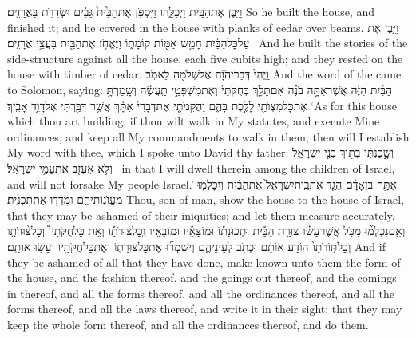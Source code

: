 {וַיִּ֥בֶן אֶת\maqqaf הַבַּ֖יִת וַיְכַלֵּ֑הוּ וַיִּסְפֹּ֤ן אֶת\maqqaf הַבַּ֙יִת֙ גֵּבִ֔ים וּשְׂדֵרֹ֖ת בָּאֲרָזִֽים׃}
{So he built the house, and finished it; and he covered in the house with planks of cedar over beams.}
{וַיִּ֤בֶן אֶת\maqqaf {} עַל\maqqaf כׇּל\maqqaf הַבַּ֔יִת חָמֵ֥שׁ אַמּ֖וֹת קוֹמָת֑וֹ וַיֶּאֱחֹ֥ז אֶת\maqqaf הַבַּ֖יִת בַּעֲצֵ֥י אֲרָזִֽים׃ \petucha }
{And he built the stories of the side-structure against all the house, each five cubits high; and they rested on the house with timber of cedar.}
{וַֽיְהִי֙ דְּבַר\maqqaf יְהֹוָ֔ה אֶל\maqqaf שְׁלֹמֹ֖ה לֵאמֹֽר׃}
{And the word of the \lord\space came to Solomon, saying:}
{הַבַּ֨יִת הַזֶּ֜ה אֲשֶׁר\maqqaf אַתָּ֣ה בֹנֶ֗ה אִם\maqqaf תֵּלֵ֤ךְ בְּחֻקֹּתַי֙ וְאֶת\maqqaf מִשְׁפָּטַ֣י תַּֽעֲשֶׂ֔ה וְשָֽׁמַרְתָּ֥ אֶת\maqqaf כׇּל\maqqaf מִצְוֺתַ֖י לָלֶ֣כֶת בָּהֶ֑ם וַהֲקִמֹתִ֤י אֶת\maqqaf דְּבָרִי֙ אִתָּ֔ךְ אֲשֶׁ֥ר דִּבַּ֖רְתִּי אֶל\maqqaf דָּוִ֥ד אָבִֽיךָ׃}
{‘As for this house which thou art building, if thou wilt walk in My statutes, and execute Mine ordinances, and keep all My commandments to walk in them; then will I establish My word with thee, which I spoke unto David thy father;}
{וְשָׁ֣כַנְתִּ֔י בְּת֖וֹךְ בְּנֵ֣י יִשְׂרָאֵ֑ל וְלֹ֥א אֶעֱזֹ֖ב אֶת\maqqaf עַמִּ֥י יִשְׂרָאֵֽל׃ \petucha }
{in that I will dwell therein among the children of Israel, and will not forsake My people Israel.’}
\newperek
{}
\label{haft_20}
\setcounter{chap}{43}
\setcounter{verse}{10}
{אַתָּ֣ה בֶן\maqqaf אָדָ֗ם הַגֵּ֤ד אֶת\maqqaf בֵּֽית\maqqaf יִשְׂרָאֵל֙ אֶת\maqqaf הַבַּ֔יִת וְיִכָּלְמ֖וּ מֵעֲוֺנֽוֹתֵיהֶ֑ם וּמָדְד֖וּ אֶת\maqqaf תׇּכְנִֽית׃}
{Thou, son of man, show the house to the house of Israel, that they may be ashamed of their iniquities; and let them measure accurately.}
{וְאִֽם\maqqaf נִכְלְמ֞וּ מִכֹּ֣ל אֲשֶׁר\maqqaf עָשׂ֗וּ צוּרַ֣ת הַבַּ֡יִת וּתְכוּנָת֡וֹ וּמוֹצָאָ֡יו וּמוֹבָאָ֣יו וְֽכׇל\maqqaf צוּרֹתָ֡ו וְאֵ֣ת כׇּל\maqqaf חֻקֹּתָיו֩ וְכׇל\maqqaf צ֨וּרֹתָ֤ו וְכׇל\maqqaf תּֽוֹרֹתָו֙ הוֹדַ֣ע אוֹתָ֔ם וּכְתֹ֖ב לְעֵינֵיהֶ֑ם וְיִשְׁמְר֞וּ אֶת\maqqaf כׇּל\maqqaf צוּרָת֛וֹ וְאֶת\maqqaf כׇּל\maqqaf חֻקֹּתָ֖יו וְעָשׂ֥וּ אוֹתָֽם׃}
{And if they be ashamed of all that they have done, make known unto them the form of the house, and the fashion thereof, and the goings out thereof, and the comings in thereof, and all the forms thereof, and all the ordinances thereof, and all the forms thereof, and all the laws thereof, and write it in their sight; that they may keep the whole form thereof, and all the ordinances thereof, and do them.}
